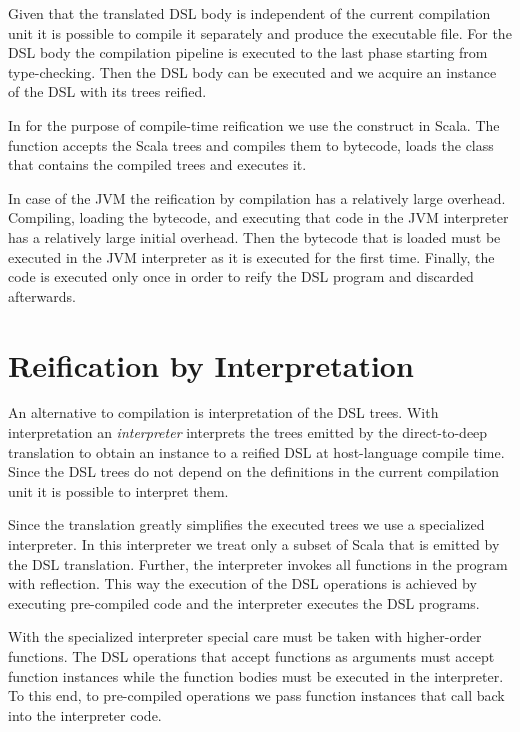 Given that the translated DSL body is independent of the current compilation unit it is possible to
 compile it separately and produce the executable file. For the DSL body the compilation
 pipeline is executed to the last phase starting from type-checking. Then the DSL body
 can be executed and we acquire an instance of the DSL with its trees reified.

In \yy for the purpose of compile-time reification we use the  construct in Scala. The  function
 accepts the Scala trees and compiles them to bytecode, loads the class that contains the compiled trees and
executes it.

In case of the JVM the reification by compilation has a relatively large overhead. Compiling, loading the bytecode, and executing that code in the JVM interpreter has a relatively large initial overhead. Then the bytecode that is loaded must be executed in the JVM interpreter as it is executed for the first time. Finally, the code is executed only once in order to reify the DSL program and discarded afterwards.

\section{Reification by Interpretation}
\label{sec:reification-by-interpretation}

An alternative to compilation is interpretation of the DSL trees. With interpretation
 an \emph{interpreter} interprets the trees emitted by the direct-to-deep translation to obtain
 an instance to a reified DSL at host-language compile time. Since the DSL trees do not depend
 on the definitions in the current compilation unit it is possible to interpret them.

Since the \yy translation greatly simplifies the executed trees we use a specialized interpreter.
 In this interpreter we treat only a subset of Scala that is emitted by the DSL translation.
 Further, the interpreter invokes all functions in the program with reflection. This way the
 execution of the DSL operations is achieved by executing pre-compiled code and the interpreter
 executes the DSL programs.

With the specialized interpreter special care must be taken with higher-order functions. The DSL operations
 that accept functions as arguments must accept function instances while the
 function bodies must be executed in the interpreter. To this end, to pre-compiled
 operations we pass function instances that call back into the interpreter code.


